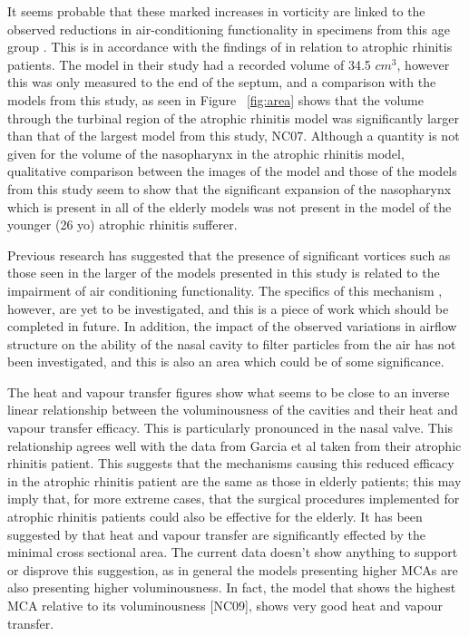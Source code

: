 It seems probable that these marked increases in vorticity are linked to the observed reductions in air-conditioning functionality in specimens from this age group \cite{Lindemann2009a}. This is in accordance with the findings of \cite{Garcia2007} in relation to atrophic rhinitis patients. The model in their study had a recorded volume of 34.5 $cm^3$, however this was only measured to the end of the septum, and a comparison with the models from this study, as seen in Figure ~\ref{fig:area} shows that the volume through the turbinal region of the atrophic rhinitis model was significantly larger than that of the largest model from this study, NC07. Although a quantity is not given for the volume of the nasopharynx in the atrophic rhinitis model, qualitative comparison between the  images of the model and those of the models from this study seem to show that the significant expansion of the nasopharynx which is present in all of the elderly models was not present in the model of the younger (26 yo) atrophic rhinitis sufferer. 

Previous research has suggested that the presence of significant vortices such as those seen in the larger of the models presented in this study is related to the impairment of air conditioning functionality. The specifics of this mechanism , however, are yet to be investigated, and this is a piece of work which should be completed in future. In addition, the impact of the observed variations in airflow structure on the ability of the nasal cavity to filter particles from the air has not been investigated, and this is also an area which could be of some significance.

The heat and vapour transfer figures show what seems to be close to an inverse linear relationship between the voluminousness of the cavities and their heat and vapour transfer efficacy. This is particularly pronounced in the nasal valve. This relationship agrees well with the data from Garcia et al \cite{Garcia2007} taken from their atrophic rhinitis patient. This suggests that the mechanisms causing this reduced efficacy in the atrophic rhinitis patient are the same as those in elderly patients; this may imply that, for more extreme cases, that the surgical procedures implemented for atrophic rhinitis patients could also be effective for the elderly. It has been suggested by \cite{Lindemann2008} that heat and vapour transfer are significantly effected by the minimal cross sectional area. The current data doesn't show anything to support or disprove this suggestion, as in general the models presenting higher MCAs are also presenting higher voluminousness. In fact, the model that shows the highest MCA relative to its voluminousness [NC09], shows very good heat and vapour transfer.

